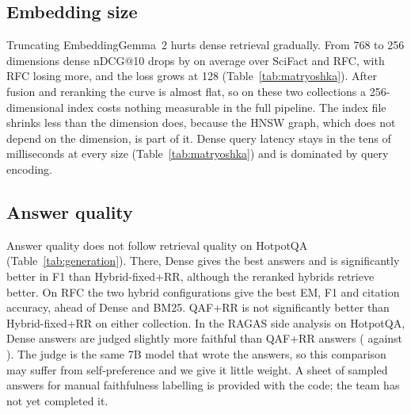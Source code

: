 
\subsection{Embedding size}
Truncating EmbeddingGemma~2 hurts dense retrieval gradually. From 768 to 256
dimensions dense nDCG@10 drops by \MatryoshkaDropTwoFiftySix{} on average over
SciFact and RFC, with RFC losing more, and the loss grows at 128
(Table~\ref{tab:matryoshka}). After fusion and reranking the curve is almost
flat, so on these two collections a 256-dimensional index costs nothing
measurable in the full pipeline.
The index file shrinks less than the dimension does, because the HNSW graph,
which does not depend on the dimension, is part of it. Dense query latency
stays in the tens of milliseconds at every size (Table~\ref{tab:matryoshka})
and is dominated by query encoding.


\subsection{Answer quality}
Answer quality does not follow retrieval quality on HotpotQA
(Table~\ref{tab:generation}). There, Dense gives the best answers and is
significantly better in F1 than Hybrid-fixed+RR, although the reranked hybrids
retrieve better. On RFC the two hybrid configurations give the best EM, F1 and
citation accuracy, ahead of Dense and BM25. QAF+RR is not significantly
better than Hybrid-fixed+RR on either collection. In the RAGAS side analysis
on HotpotQA, Dense answers are judged slightly more faithful than QAF+RR
answers (\FaithDense{} against \FaithQAF). The judge is the same 7B model that
wrote the answers, so this comparison may suffer from self-preference and we
give it little weight. A sheet of sampled answers for manual faithfulness labelling is provided
with the code; the team has not yet completed it.

